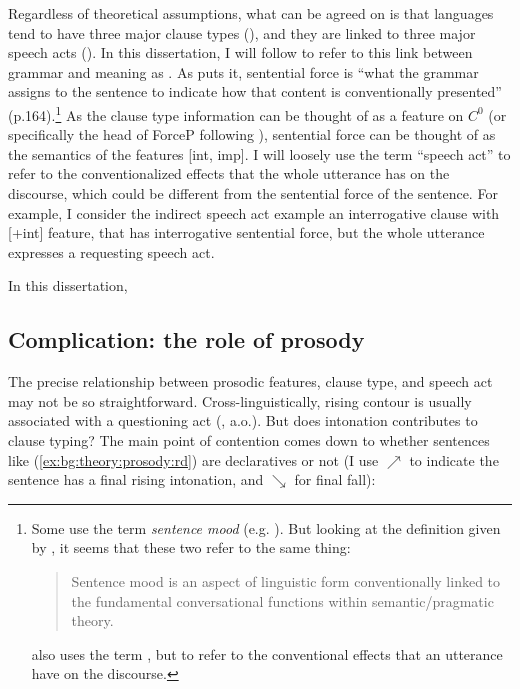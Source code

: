 Regardless of theoretical assumptions, what can be agreed on is that languages tend to have three major clause types (\diis{}), and they are linked to three major speech acts (\aqrs{}). In this dissertation, I will follow \textcite{chierchia1990textbook} to refer to this link between grammar and meaning as . As \textcite{chierchia1990textbook} puts it, sentential force is ``what the grammar assigns to the sentence to indicate how that content is conventionally presented'' (p.164).\footnote{Some use the term \emph{sentence mood} (e.g. \cite{portner2018}). But looking at the definition given by \textcite{portner2018}, it seems that these two refer to the same thing:
\begin{quote}
Sentence mood is an aspect of linguistic form conventionally linked to the fundamental conversational functions within semantic/pragmatic theory.\\
\hspace*{\fill} \hfill \textcite[p.122]{portner2018}
\end{quote}
\cite{portner2018} also uses the term , but to refer to the conventional effects that an utterance have on the discourse.  
} As the clause type information can be thought of as a feature on $C^{0}$ (or specifically the head of ForceP following \cite{rizzi1997}), sentential force can be thought of as the semantics of the features [\textpm int, \textpm imp]. I will loosely use the term ``speech act'' to refer to the conventionalized effects that the whole utterance has on the discourse, which could be different from the sentential force of the sentence. For example, I consider the indirect speech act example  an interrogative clause with [+int] feature, that has interrogative sentential force, but the whole utterance expresses a requesting speech act. 




In this dissertation, 

\subsection{Complication: the role of prosody}
\label{sec:bg:theory:prosody}
The precise relationship between prosodic features, clause type, and speech act may not be so straightforward. Cross-linguistically, rising contour is usually associated with a questioning act (\citealt{bolinger1978, ladd1981, gussenhovenchen2000, ladd2001typology}, a.o.). But does intonation contributes to clause typing? The main point of contention comes down to whether sentences like (\ref{ex:bg:theory:prosody:rd}) are declaratives or not (I use $\nearrow$ to indicate the sentence has a final rising intonation, and $\searrow$ for final fall):
 
